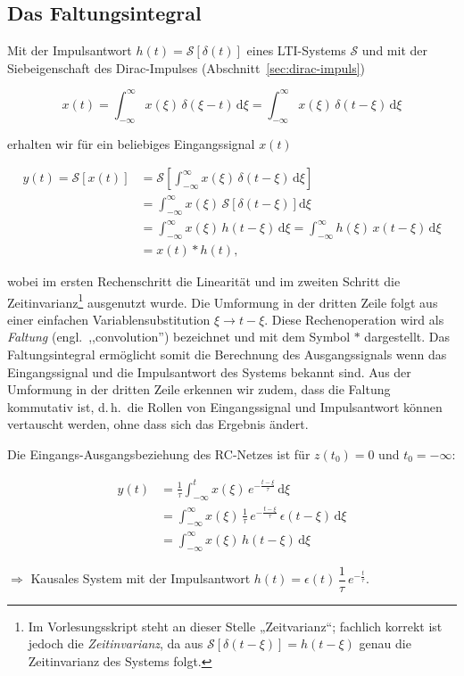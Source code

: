 \subsection{Das Faltungsintegral}
\label{sec:faltungsintegral}

Mit der Impulsantwort $h(t) = \mathcal{S}[\delta(t)]$ eines LTI-Systems $\mathcal{S}$ und mit der Siebeigenschaft des Dirac-Impulses (Abschnitt~\ref{sec:dirac-impuls})

$$
x(t) = \int_{-\infty}^{\infty} x(\xi)\,\delta(\xi - t)\,\mathrm{d}\xi = \int_{-\infty}^{\infty} x(\xi)\,\delta(t - \xi)\,\mathrm{d}\xi
$$

erhalten wir für ein beliebiges Eingangssignal $x(t)$

\begin{align}
y(t) = \mathcal{S}\left[x(t)\right] &= \mathcal{S}\!\left[\int_{-\infty}^{\infty} x(\xi)\,\delta(t-\xi)\,\mathrm{d}\xi\right] \nonumber \\
&= \int_{-\infty}^{\infty} x(\xi)\,\mathcal{S}\!\left[\delta(t-\xi)\right]\mathrm{d}\xi \nonumber \\
&= \int_{-\infty}^{\infty} x(\xi)\,h(t-\xi)\,\mathrm{d}\xi = \int_{-\infty}^{\infty} h(\xi)\,x(t-\xi)\,\mathrm{d}\xi \nonumber \\
&= x(t) * h(t),
\label{eq:faltung}
\end{align}

wobei im ersten Rechenschritt die Linearität und im zweiten Schritt die Zeitinvarianz\footnote{Im Vorlesungsskript steht an dieser Stelle „Zeitvarianz``; fachlich korrekt ist jedoch die \emph{Zeitinvarianz}, da aus $\mathcal{S}[\delta(t-\xi)] = h(t-\xi)$ genau die Zeitinvarianz des Systems folgt.} ausgenutzt wurde. Die Umformung in der dritten Zeile folgt aus einer einfachen Variablensubstitution $\xi \to t - \xi$. Diese Rechenoperation wird als \textit{Faltung} (engl.\ ,,convolution'') bezeichnet und mit dem Symbol $*$ dargestellt. Das Faltungsintegral ermöglicht somit die Berechnung des Ausgangssignals wenn das Eingangssignal und die Impulsantwort des Systems bekannt sind. Aus der Umformung in der dritten Zeile erkennen wir zudem, dass die Faltung kommutativ ist, d.\,h.\ die Rollen von Eingangssignal und Impulsantwort können vertauscht werden, ohne dass sich das Ergebnis ändert.

\begin{beispiel}
Die Eingangs-Ausgangsbeziehung des RC-Netzes ist für $z(t_0) = 0$ und $t_0 = -\infty$:

\begin{align*}
y(t) &= \frac{1}{\tau}\int_{-\infty}^{t} x(\xi)\,e^{-\frac{t-\xi}{\tau}}\,\mathrm{d}\xi \\
     &= \int_{-\infty}^{\infty} x(\xi)\,\frac{1}{\tau}\,e^{-\frac{t-\xi}{\tau}}\,\epsilon(t-\xi)\,\mathrm{d}\xi \\
     &= \int_{-\infty}^{\infty} x(\xi)\,h(t-\xi)\,\mathrm{d}\xi
\end{align*}

$\Rightarrow$ Kausales System mit der Impulsantwort $h(t) = \epsilon(t)\,\dfrac{1}{\tau}\,e^{-\frac{t}{\tau}}$.
\end{beispiel}


